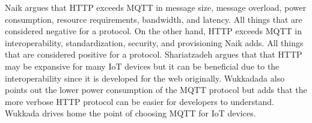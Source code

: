 Naik argues that HTTP exceeds MQTT in message size, message overload, power consumption, resource requirements, bandwidth, and latency. 
All things that are considered negative for a protocol.\cite{Naik2017}
On the other hand, HTTP exceeds MQTT in interoperability, standardization, security, and provisioning Naik adds.\cite{Naik2017}
All things that are considered positive for a protocol.
Shariatzadeh argues that that HTTP may be expansive for many IoT devices but it can be beneficial due to the interoperability since it is developed for the web originally.\cite{Shariatzadeh2016}
Wukkadada also points out the lower power consumption of the MQTT protocol but adds that the more verbose HTTP protocol can be easier for developers to understand.\cite{Wukkadada2018}
Wukkada drives home the point of choosing MQTT for IoT devices.\cite{Wukkadada2018}